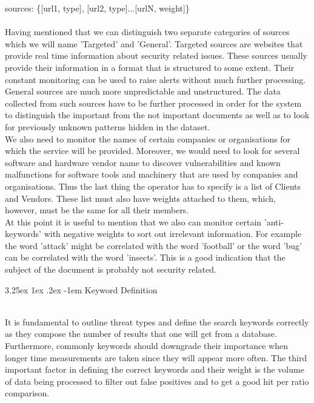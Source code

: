 \documentclass[12pt]{article}
\makeatletter
\renewcommand\paragraph{\@startsection{paragraph}{5}{\z@}%
  {3.25ex \@plus1ex \@minus.2ex}%
  {-1em}%
  {\normalfont\normalsize\bfseries}}
\makeatother
\begin{document}
sources: \{[url1, type], [url2, type]...[urlN, weight]\}\\\\
Having mentioned that we can distinguish two separate categories of sources which we will name 'Targeted' and 'General'. Targeted sources are websites that provide real time information about security related issues. These sources usually provide their information in a format that is structured to some extent. Their constant monitoring can be used to raise alerts without much further processing.
\hfill \break \\
General sources are much more unpredictable and unstructured. The data collected from such sources have to be further processed in order for the system to distinguish the important from the not important documents as well as to look for previously unknown patterns hidden in the dataset. 
\hfill \break \\
We also need to monitor the names of certain companies or organisations for which the service will be provided. Moreover, we would need to look for several software and hardware vendor name to discover vulnerabilities and known malfunctions for software tools and machinery that are used by companies and organisations. Thus the last thing the operator has to specify is a list of Clients and Vendors. These list must also have weights attached to them, which, however, must be the same for all their members. 
\hfill \break \\
At this point it is useful to mention that we also can monitor certain 'anti-keywords' with negative weights to sort out irrelevant information. For example the word 'attack' might be correlated with the word 'football' or the word 'bug' can be correlated with the word 'insects'. This is a good indication that the subject of the document is probably not security related. 

\paragraph{Keyword Definition}

\hfill \break \\
It is fundamental to outline threat types and define the search keywords correctly as they compose the number of results that one will get from a database. Furthermore, commonly keywords should downgrade their importance when longer time measurements are taken since they will appear more often. The third important factor in defining the correct keywords and their weight is the volume of data being processed to filter out false positives and to get a good hit per ratio comparison.
\end{document}
